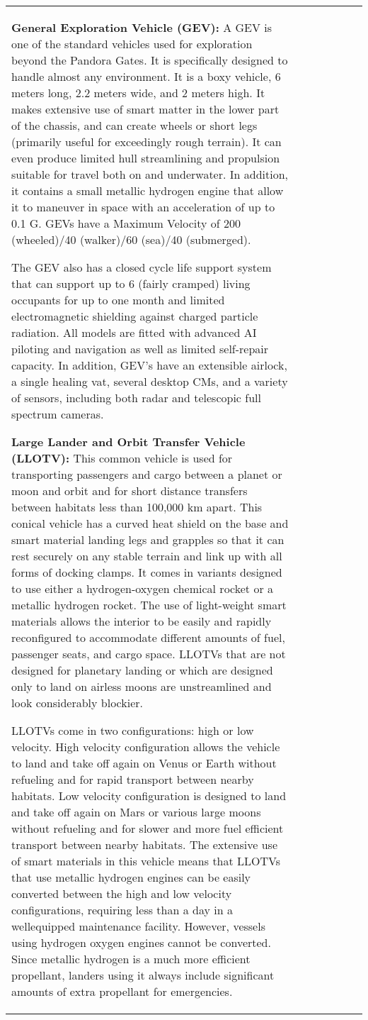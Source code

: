 \begin{tabular}{|l|l|l|l|l|l|l|}
\textbf{General Exploration Vehicle (GEV):} A GEV is one of the standard vehicles used for exploration beyond the Pandora Gates. It is specifically designed to handle almost any environment. It is a boxy vehicle, 6 meters long, 2.2 meters wide, and 2 meters high. It makes extensive use of smart matter in the lower part of the chassis, and can create wheels or short legs (primarily useful for exceedingly rough terrain). It can even produce limited hull streamlining and propulsion suitable for travel both on and underwater. In addition, it contains a small metallic hydrogen engine that allow it to maneuver in space with an acceleration of up to 0.1 G. GEVs have a Maximum Velocity of 200 (wheeled)/40 (walker)/60 (sea)/40 (submerged). 

The GEV also has a closed cycle life support system that can support up to 6 (fairly cramped) living occupants for up to one month and limited electromagnetic shielding against charged particle radiation. All models are fitted with advanced AI piloting and navigation as well as limited self-repair capacity. In addition, GEV’s have an extensible airlock, a single healing vat, several desktop CMs, and a variety of sensors, including both radar and telescopic full spectrum cameras. 

\textbf{Large Lander and Orbit Transfer Vehicle (LLOTV):} This common vehicle is used for transporting passengers and cargo between a planet or moon and orbit and for short distance transfers between habitats less than 100,000 km apart. This conical vehicle has a curved heat shield on the base and smart material landing legs and grapples so that it can rest securely on any stable terrain and link up with all forms of docking clamps. It comes in variants designed to use either a hydrogen-oxygen chemical rocket or a metallic hydrogen rocket. The use of light-weight smart materials allows the interior to be easily and rapidly reconfigured to accommodate different amounts of fuel, passenger seats, and cargo space. LLOTVs that are not designed for planetary landing or which are designed only to land on airless moons are unstreamlined and look considerably blockier. 

LLOTVs come in two configurations: high or low velocity. High velocity configuration allows the vehicle to land and take off again on Venus or Earth without refueling and for rapid transport between nearby habitats. Low velocity configuration is designed to land and take off again on Mars or various large moons without refueling and for slower and more fuel efficient transport between nearby habitats. The extensive use of smart materials in this vehicle means that LLOTVs that use metallic hydrogen engines can be easily converted between the high and low velocity configurations, requiring less than a day in a wellequipped maintenance facility. However, vessels using hydrogen oxygen engines cannot be converted. Since metallic hydrogen is a much more efficient propellant, landers using it always include significant amounts of extra propellant for emergencies. 


\end{tabular}
